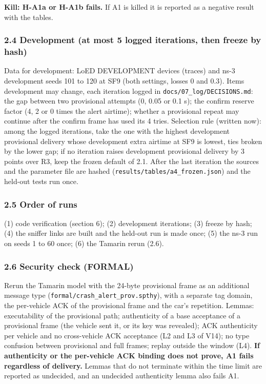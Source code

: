 \textbf{Kill: H-A1a or H-A1b fails.} If A1 is killed it is reported as a negative result with the tables.

\subsubsection*{2.4 Development (at most 5 logged iterations, then freeze by hash)}

Data for development: LoED DEVELOPMENT devices (traces) and ns-3 development seeds 101 to 120 at SF9 (both settings, losses 0 and 0.3). Items development may change, each iteration logged in \texttt{docs/07\_log/DECISIONS.md}: the gap between two provisional attempts (0, 0.05 or 0.1 s); the confirm reserve factor (4, 2 or 0 times the alert airtime); whether a provisional repeat may continue after the confirm frame has used its 4 tries. Selection rule (written now): among the logged iterations, take the one with the highest development provisional delivery whose development extra airtime at SF9 is lowest, ties broken by the lower gap; if no iteration raises development provisional delivery by 3 points over R3, keep the frozen default of 2.1. After the last iteration the sources and the parameter file are hashed (\texttt{results/tables/a4\_frozen.json}) and the held-out tests run once.

\subsubsection*{2.5 Order of runs}

(1) code verification (section 6); (2) development iterations; (3) freeze by hash; (4) the sniffer links are built and the held-out run is made once; (5) the ns-3 run on seeds 1 to 60 once; (6) the Tamarin rerun (2.6).

\subsubsection*{2.6 Security check (FORMAL)}

Rerun the Tamarin model with the 24-byte provisional frame as an additional message type (\texttt{formal/crash\_alert\_prov.spthy}), with a separate tag domain, the per-vehicle ACK of the provisional frame and the car's repetition. Lemmas: executability of the provisional path; authenticity of a base acceptance of a provisional frame (the vehicle sent it, or its key was revealed); ACK authenticity per vehicle and no cross-vehicle ACK acceptance (L2 and L3 of V14); no type confusion between provisional and full frames; replay outside the window (L4). \textbf{If authenticity or the per-vehicle ACK binding does not prove, A1 fails regardless of delivery.} Lemmas that do not terminate within the time limit are reported as undecided, and an undecided authenticity lemma also fails A1.


